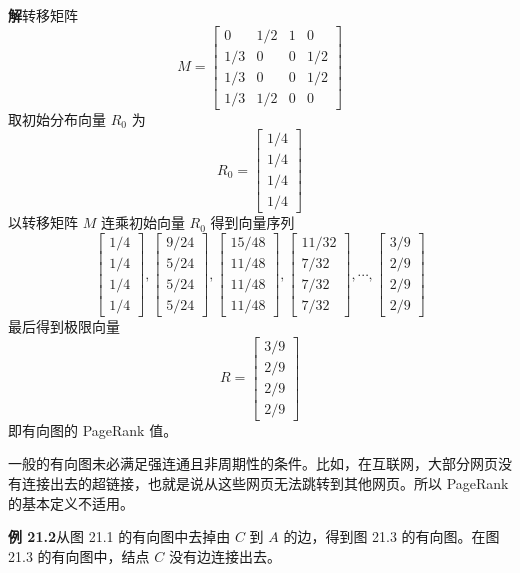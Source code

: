 \documentclass[UTF8, 12pt, fontset=fandol, oneside]{ctexart}
\begin{document}
\noindent\textbf{解}\quad 转移矩阵
\[
M=
\begin{bmatrix}
0 & 1/2 & 1 & 0\\
1/3 & 0 & 0 & 1/2\\
1/3 & 0 & 0 & 1/2\\
1/3 & 1/2 & 0 & 0
\end{bmatrix}
\]
取初始分布向量 $R_0$ 为
\[
R_0=
\begin{bmatrix}
1/4\\
1/4\\
1/4\\
1/4
\end{bmatrix}
\]
以转移矩阵 $M$ 连乘初始向量 $R_0$ 得到向量序列
\[
\begin{bmatrix}
1/4\\
1/4\\
1/4\\
1/4
\end{bmatrix},
\begin{bmatrix}
9/24\\
5/24\\
5/24\\
5/24
\end{bmatrix},
\begin{bmatrix}
15/48\\
11/48\\
11/48\\
11/48
\end{bmatrix},
\begin{bmatrix}
11/32\\
7/32\\
7/32\\
7/32
\end{bmatrix},
\cdots,
\begin{bmatrix}
3/9\\
2/9\\
2/9\\
2/9
\end{bmatrix}
\]
最后得到极限向量
\[
R=
\begin{bmatrix}
3/9\\
2/9\\
2/9\\
2/9
\end{bmatrix}
\]
即有向图的 PageRank 值。

一般的有向图未必满足强连通且非周期性的条件。比如，在互联网，大部分网页没有连接出去的超链接，也就是说从这些网页无法跳转到其他网页。所以 PageRank 的基本定义不适用。

\noindent\textbf{例 21.2}\quad 从图 21.1 的有向图中去掉由 $C$ 到 $A$ 的边，得到图 21.3 的有向图。在图 21.3 的有向图中，结点 $C$ 没有边连接出去。
\end{document}
